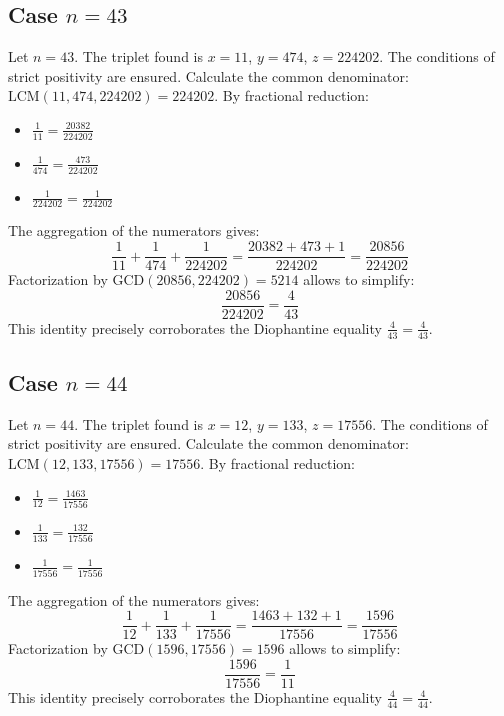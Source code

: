 \documentclass[11pt,a4paper]{article}
\begin{document}
\subsection{Case $n = 43$}
Let $n = 43$. The triplet found is $x = 11$, $y = 474$, $z = 224202$.
The conditions of strict positivity are ensured.
Calculate the common denominator: $\text{LCM}(11, 474, 224202) = 224202$.
By fractional reduction:
\begin{itemize}
    \item $\frac{1}{11} = \frac{20382}{224202}$
    \item $\frac{1}{474} = \frac{473}{224202}$
    \item $\frac{1}{224202} = \frac{1}{224202}$
\end{itemize}
The aggregation of the numerators gives:
$$ \frac{1}{11} + \frac{1}{474} + \frac{1}{224202} = \frac{20382 + 473 + 1}{224202} = \frac{20856}{224202} $$
Factorization by $\text{GCD}(20856, 224202) = 5214$ allows to simplify:
$$ \frac{20856}{224202} = \frac{4}{43} $$
This identity precisely corroborates the Diophantine equality $\frac{4}{43} = \frac{4}{43}$.

\subsection{Case $n = 44$}
Let $n = 44$. The triplet found is $x = 12$, $y = 133$, $z = 17556$.
The conditions of strict positivity are ensured.
Calculate the common denominator: $\text{LCM}(12, 133, 17556) = 17556$.
By fractional reduction:
\begin{itemize}
    \item $\frac{1}{12} = \frac{1463}{17556}$
    \item $\frac{1}{133} = \frac{132}{17556}$
    \item $\frac{1}{17556} = \frac{1}{17556}$
\end{itemize}
The aggregation of the numerators gives:
$$ \frac{1}{12} + \frac{1}{133} + \frac{1}{17556} = \frac{1463 + 132 + 1}{17556} = \frac{1596}{17556} $$
Factorization by $\text{GCD}(1596, 17556) = 1596$ allows to simplify:
$$ \frac{1596}{17556} = \frac{1}{11} $$
This identity precisely corroborates the Diophantine equality $\frac{4}{44} = \frac{4}{44}$.
\end{document}

